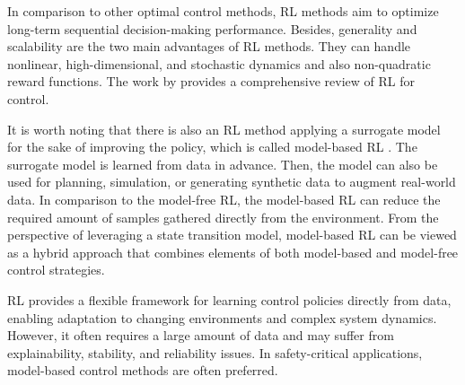 In comparison to other optimal control methods, \ac{RL} methods aim to optimize long-term sequential decision-making performance. Besides, generality and scalability are the two main advantages of \ac{RL} methods. They can handle nonlinear, high-dimensional, and stochastic dynamics and also non-quadratic reward functions. The work by \citeauthor{rlforcontrol2018} \citeyearpar{rlforcontrol2018} provides a comprehensive review of \ac{RL} for control. 

It is worth noting that there is also an \ac{RL} method applying a surrogate model for the sake of improving the policy, which is called model-based \ac{RL} \citep{sutton1990, mbrl2020}. The surrogate model is learned from data in advance. Then, the model can also be used for planning, simulation, or generating synthetic data to augment real-world data. In comparison to the model-free \ac{RL}, the model-based \ac{RL} can reduce the required amount of samples gathered directly from the environment. From the perspective of leveraging a state transition model, model-based \ac{RL} can be viewed as a hybrid approach that combines elements of both model-based and model-free control strategies.

\ac{RL} provides a flexible framework for learning control policies directly from data, enabling adaptation to changing environments and complex system dynamics. However, it often requires a large amount of data and may suffer from explainability, stability, and reliability issues. In safety-critical applications, model-based control methods are often preferred.